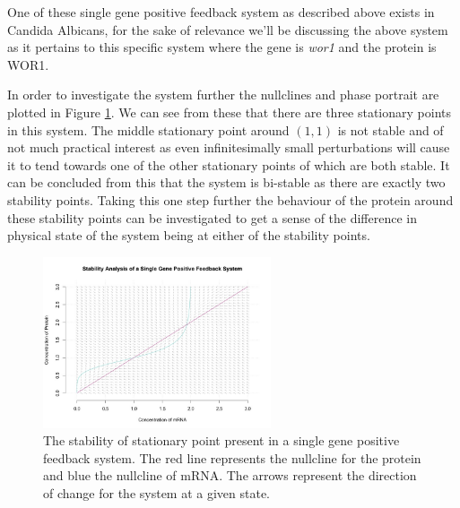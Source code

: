 \documentclass[]{article}
\begin{document}
            One of these single gene positive feedback system as described above exists in Candida Albicans, for the sake of relevance we'll be discussing the above system as it pertains to this specific system where the gene is \textit{wor1} and the protein is WOR1. 
            
            In order to investigate the system further the nullclines and phase portrait are plotted in Figure \ref{stabilitySinglePositive}. We can see from these that there are three stationary points in this system. The middle stationary point around $(1,1)$ is not stable and of not much practical interest as even infinitesimally small perturbations will cause it to tend towards one of the other stationary points of which are both stable. It can be concluded from this that the system is bi-stable as there are exactly two stability points. Taking this one step further the behaviour of the protein around these stability points can be investigated to get a sense of the difference in physical state of the system being at either of the stability points. 
            
             \begin{figure}[h]
            \centering
            \includegraphics[width=0.6\textwidth]{./figures/stabilitySinglePositive.jpeg}
            \caption{The stability of stationary point present in a single gene positive feedback system. The red line represents the nullcline for the protein and blue the nullcline of mRNA. The arrows represent the direction of change for the system at a given state.}
            \label{stabilitySinglePositive}
            \end{figure}
            
\end{document}
